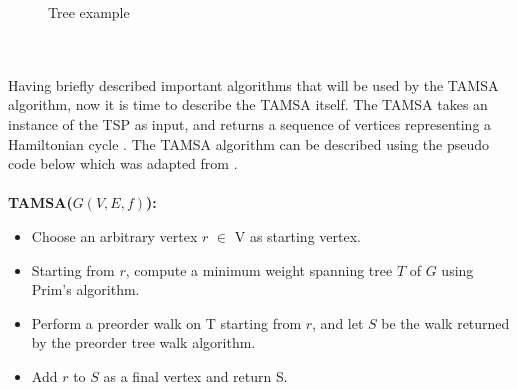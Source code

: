 \documentclass[12pt]{article}
\numberwithin{equation}{subsection}
\numberwithin{table}{subsection}
\begin{document}
\begin{figure}[h]
\centering
{}
\caption{Tree example}
\label{tree_example}
\end{figure}\\\\
Having briefly described important algorithms that will be used by the TAMSA algorithm, now it is time to describe the TAMSA itself. The TAMSA takes an instance of the TSP as input, and returns a sequence of vertices representing a Hamiltonian cycle \cite{cormen_leiserson_rivest_stein}. The TAMSA algorithm can be described using the pseudo code below which was adapted from \cite{cormen_leiserson_rivest_stein}.\\\\
\textbf{TAMSA($G(V,E,f)$):}
\begin{itemize}
\itemsep0em
\item Choose an arbitrary vertex $r$ $\in$ V as starting vertex.
\item Starting from $r$, compute a minimum weight spanning tree $T$ of $G$ using Prim's algorithm.
\item Perform a preorder walk on T starting from $r$, and let $S$ be the walk returned by the preorder tree walk algorithm.
\item Add $r$ to $S$ as a final vertex and return S.
\end{itemize}
\end{document}
